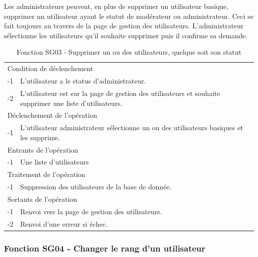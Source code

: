 \documentclass[a4paper]{article}
\begin{document}
Les administrateurs peuvent, en plus de supprimer un utilisateur basique, supprimer un utilisateur ayant le statut de modérateur ou administrateur. Ceci se fait toujours au travers de la page de gestion des utilisateurs. L'administrateur sélectionne les utilisateurs qu'il souhaite supprimer puis il confirme sa demande.

\begin{table}[H]
  \centering
   \small
	\begin{tabular}{|c|p{12cm}|}
   		\hline
   			\rowcolor{lightgray}\multicolumn{2}{|c|}{\textbf{Fonction SG03 - Supprimer un ou des utilisateurs}} \\
   		\hline
   			\multicolumn{2}{|l|}{Condition de déclenchement} \\
   		\hline
   			-1 & L'utilisateur a le status d'administrateur.\\
        			-2 & L'utilisateur est sur la page de gestion des utilisateurs et souhaite supprimer une liste d'utilisateurs.\\
   		\hline
   			\multicolumn{2}{|l|}{Déclenchement de l'opération} \\
   		\hline
   			-1 & L'utilisateur administrateur sélectionne un ou des utilisateurs basiques et les supprime.\\
   		\hline
   			\multicolumn{2}{|l|}{Entrants de l'opération} \\
   		\hline
   			-1 & Une liste d'utilisateurs\\
   		\hline
   			\multicolumn{2}{|l|}{Traitement de l'opération} \\
  		\hline
   			-1 & Suppression des utilisateurs de la base de donnée.\\
   		\hline
   			\multicolumn{2}{|l|}{Sortants de l'opération} \\
   		\hline
   			-1 & Renvoi vers la page de gestion des utilisateurs.\\
        			-2 & Renvoi d'une erreur si échec.\\ 
   		\hline
	\end{tabular}
  \caption{Fonction SG03 - Supprimer un ou des utilisateurs, quelque soit son statut}
  \normalsize
  \label{tab: supprimmer_utilisateur}
\end{table}

\subsubsection{Fonction SG04 - Changer le rang d'un utilisateur}
\end{document}
